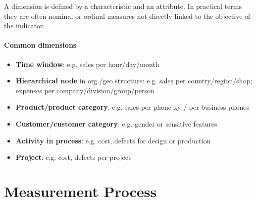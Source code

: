 A dimension is defined by a characteristic and an attribute. In practical terms they are
often nominal or ordinal measures not directly linked to the objective of the indicator.

\paragraph{Common dimensions}
\begin{itemize}
  \item \textbf{Time window}: e.g. sales per hour/day/month
  \item \textbf{Hierarchical node} in org./geo structure:
        e.g. sales per country/region/shop; expenses per company/division/group/person
  \item \textbf{Product/product category}: e.g. sales per phone xy / per business phones
  \item \textbf{Customer/customer category}: e.g. gender or sensitive features
  \item \textbf{Activity in process}: e.g. cost, defects for design or production
  \item \textbf{Project}: e.g. cost, defects per project
\end{itemize}

\section{Measurement Process}





